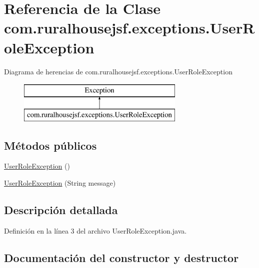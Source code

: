 \hypertarget{classcom_1_1ruralhousejsf_1_1exceptions_1_1_user_role_exception}{}\section{Referencia de la Clase com.\+ruralhousejsf.\+exceptions.\+User\+Role\+Exception}
\label{classcom_1_1ruralhousejsf_1_1exceptions_1_1_user_role_exception}
Diagrama de herencias de com.\+ruralhousejsf.\+exceptions.\+User\+Role\+Exception\begin{figure}[H]
\begin{center}
\leavevmode
\includegraphics[height=2.000000cm]{classcom_1_1ruralhousejsf_1_1exceptions_1_1_user_role_exception}
\end{center}
\end{figure}
\subsection*{Métodos públicos}
\begin{DoxyCompactItemize}
\item 
\mbox{\hyperlink{classcom_1_1ruralhousejsf_1_1exceptions_1_1_user_role_exception_a8ca96b595e439045ef33ddcea0c21da2}{User\+Role\+Exception}} ()
\item 
\mbox{\hyperlink{classcom_1_1ruralhousejsf_1_1exceptions_1_1_user_role_exception_a7c888f23edf10f7c1347519b6d03752d}{User\+Role\+Exception}} (String message)
\end{DoxyCompactItemize}


\subsection{Descripción detallada}


Definición en la línea 3 del archivo User\+Role\+Exception.\+java.



\subsection{Documentación del constructor y destructor}
\mbox{\label{classcom_1_1ruralhousejsf_1_1exceptions_1_1_user_role_exception_a8ca96b595e439045ef33ddcea0c21da2}} 
